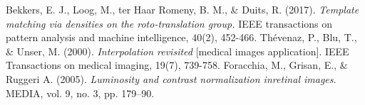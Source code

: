 \documentclass{article}
\begin{document}
\begin{thebibliography}{9}

    Bekkers, E. J., Loog, M., ter Haar Romeny, B. M., \& Duits, R. (2017).
    \emph{Template matching via densities on the roto-translation group.}
    IEEE transactions on pattern analysis and machine intelligence, 40(2), 452-466.
    Thévenaz, P., Blu, T., \& Unser, M. (2000). \emph{Interpolation revisited} [medical
    images application]. IEEE Transactions on medical imaging, 19(7), 739-758.
    Foracchia, M., Grisan, E., \& Ruggeri A. (2005). \emph{Luminosity  and  contrast  normalization  inretinal images}.
    MEDIA, vol. 9, no. 3, pp. 179–90.

\end{thebibliography}

        
\end{document}

